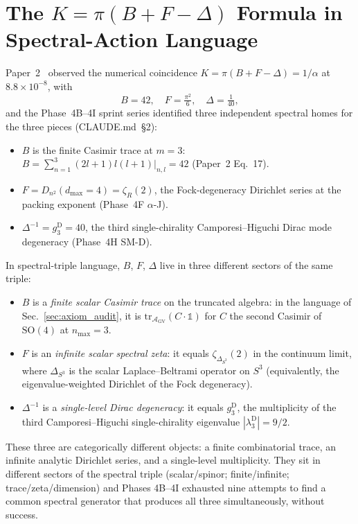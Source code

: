 \documentclass[11pt]{article}
\begin{document}
\section{The $K = \pi(B + F - \Delta)$ Formula in Spectral-Action
Language}
\label{sec:K_decomposition}

Paper~2~\cite{paper2} observed the numerical coincidence
$K = \pi(B + F - \Delta) = 1/\alpha$ at $8.8 \times 10^{-8}$, with
\[
   B = 42, \quad F = \tfrac{\pi^2}{6}, \quad \Delta = \tfrac{1}{40},
\]
and the Phase~4B--4I sprint series identified three independent
spectral homes for the three pieces (CLAUDE.md~\S 2):
\begin{itemize}\setlength{\itemsep}{0pt}
\item $B$ is the finite Casimir trace at $m=3$:
$B = \sum_{n=1}^{3} (2l+1)l(l+1)|_{n,l} = 42$ (Paper~2 Eq.~17).
\item $F = D_{n^2}(d_{\max} = 4) = \zeta_R(2)$, the Fock-degeneracy
Dirichlet series at the packing exponent (Phase~4F $\alpha$-J).
\item $\Delta^{-1} = g_3^{\mathrm{D}} = 40$, the third single-chirality
Camporesi--Higuchi Dirac mode degeneracy (Phase~4H SM-D).
\end{itemize}

In spectral-triple language, $B$, $F$, $\Delta$ live in three different
sectors of the same triple:

\begin{itemize}\setlength{\itemsep}{2pt}
\item $B$ is a \emph{finite scalar Casimir trace} on the truncated
algebra: in the language of Sec.~\ref{sec:axiom_audit}, it is
$\mathrm{tr}_{\mathcal{A}_{\mathrm{GV}}}(C \cdot \mathbb{1})$ for $C$
the second Casimir of $\mathrm{SO}(4)$ at $n_{\max} = 3$.
\item $F$ is an \emph{infinite scalar spectral zeta}: it equals
$\zeta_{\Delta_{S^3}}(2)$ in the continuum limit, where
$\Delta_{S^3}$ is the scalar Laplace--Beltrami operator on $S^3$
(equivalently, the eigenvalue-weighted Dirichlet of the Fock
degeneracy).
\item $\Delta^{-1}$ is a \emph{single-level Dirac degeneracy}: it
equals $g_3^{\mathrm{D}}$, the multiplicity of the third
Camporesi--Higuchi single-chirality eigenvalue
$|\lambda_3^{\mathrm{D}}| = 9/2$.
\end{itemize}

These three are categorically different objects: a finite
combinatorial trace, an infinite analytic Dirichlet series, and a
single-level multiplicity.  They sit in different sectors of the
spectral triple (scalar/spinor; finite/infinite; trace/zeta/dimension)
and Phases 4B--4I exhausted nine attempts to find a common spectral
generator that produces all three simultaneously, without success.
\end{document}
